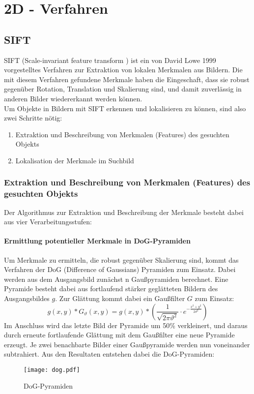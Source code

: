 
\chapter{2D - Verfahren}
\label{chap:2d}
	\section{SIFT}
SIFT (Scale-invariant feature transform \cite{Lowe2004}) ist ein von David Lowe 1999 vorgestelltes Verfahren zur Extraktion von lokalen Merkmalen aus Bildern. Die mit diesem Verfahren gefundene Merkmale haben die Eingeschaft, dass sie robust gegenüber Rotation, Translation und Skalierung sind, und damit zuverlässig in anderen Bilder wiedererkannt werden können. \\
Um Objekte in Bildern mit SIFT erkennen und lokalisieren zu können, sind also zwei Schritte nötig:
\begin{enumerate}
	\item Extraktion und Beschreibung von Merkmalen (Features) des gesuchten Objekts
	\item Lokalisation der Merkmale im Suchbild
\end{enumerate}

\subsection{Extraktion und Beschreibung von Merkmalen (Features) des gesuchten Objekts}
Der Algorithmus zur Extraktion und Beschreibung der Merkmale besteht dabei aus vier Verarbeitungsstufen:
	\subsubsection{Ermittlung potentieller Merkmale in DoG-Pyramiden}
		Um Merkmale zu ermitteln, die robust gegenüber Skalierung sind, kommt das Verfahren der DoG (Difference of Gaussians) Pyramiden zum Einsatz. Dabei werden aus dem Ausgangsbild zunächst n Gaußpyramiden berechnet. Eine Pyramide besteht dabei aus fortlaufend stärker geglätteten Bildern des Ausgangsbildes $g$. Zur Glättung kommt dabei ein Gaußfilter $G$ zum Einsatz:
\begin{equation*}
 g(x, y) * G_\vartheta (x, y) = g(x, y) * (\frac{1}{\sqrt{2\pi \vartheta ^2}}\cdot e^{-\frac{x^2 + y^2}{2\vartheta ^2}})
\end{equation*}
\newpage
Im Anschluss wird das letzte Bild der Pyramide um 50\% verkleinert, und daraus durch erneute fortlaufende Glättung mit dem Gaußfilter eine neue Pyramide erzeugt.
Je zwei benachbarte Bilder einer Gaußpyramide werden nun voneinander subtrahiert. Aus den Resultaten entstehen dabei die DoG-Pyramiden:
\begin{figure}
  \begin{center}
    \texttt{[image: dog.pdf]}
    \caption{DoG-Pyramiden}
    \label{fig:dog_pyr}
  \end{center}
\end{figure}

